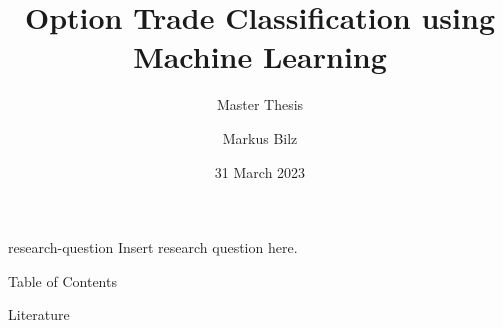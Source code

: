\documentclass[en,]{sdqbeamer}
\title[Option Trade Classification using Machine Learning]{Option Trade Classification using Machine Learning}
\subtitle{Master Thesis}
\author[Markus Bilz]{Markus Bilz}
\date[31.\,3.\,2023]{31 March 2023}
\begin{document}
\KITtitleframe

\begin{frame}[plain]{research-question}
	\Large
	\centering
	Insert research question here.
\end{frame}

\begin{frame}{Table of Contents}
	\tableofcontents
\end{frame}



\begin{frame}{Literature}
	\printbibliography
\end{frame}

\end{document}
